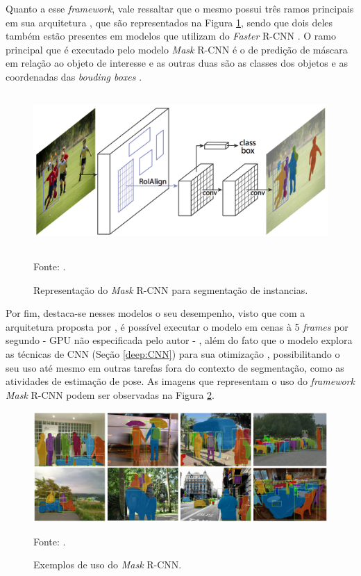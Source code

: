 Quanto a esse \textit{framework}, vale ressaltar que o mesmo possui três ramos principais em sua arquitetura \cite{He2020, Minaee2021}, que são representados na Figura \ref{instance:fig:2}, sendo que dois deles também estão presentes em modelos que utilizam do \textit{Faster} R-CNN \cite{Ren2017}. O ramo principal que é executado pelo modelo \textit{Mask} R-CNN é o de predição de máscara em relação ao objeto de interesse e as outras duas são as classes dos objetos e as coordenadas das \textit{bouding boxes} \cite{Minaee2021}.

\begin{figure}[H]
    \centering
    \caption{Representação do \textit{Mask} R-CNN para segmentação de instancias.}
    \includegraphics[height=2.3in]{recursos/imagens/instance/Mask-R-CNN_examp.png}
    \label{instance:fig:2}

    Fonte: \cite{He2020}.
\end{figure}

Por fim, destaca-se nesses modelos o seu desempenho, visto que com a arquitetura proposta por \cite{He2020}, é possível executar o modelo em cenas à 5 \textit{frames} por segundo - GPU não especificada pelo autor - \cite{Minaee2021, He2020, Hafiz2020}, além do fato que o modelo explora as técnicas de CNN (Seção \ref{deep:CNN}) para sua otimização \cite{Li2020}, possibilitando o seu uso até mesmo em outras tarefas fora do contexto de segmentação, como as atividades de estimação de pose. As imagens que representam o uso do \textit{framework} \textit{Mask} R-CNN podem ser observadas na Figura \ref{instance:fig:3}.

\begin{figure}[H]
    \centering
    \caption{Exemplos de uso do \textit{Mask} R-CNN.}
    \includegraphics[width=1\textwidth]{recursos/imagens/instance/insta_examp.png}
    \label{instance:fig:3}

    Fonte: \cite{He2020}.
\end{figure}


